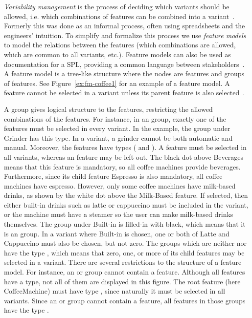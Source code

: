 \emph{Variability management} is the process of deciding which variants should be allowed, i.e. which combinations of features can be combined into a variant~\cite{art:variability-management-with-feature-models}. Formerly this was done as an informal process, often using spreadsheets and the engineers' intuition. To simplify and formalize this process we use \emph{feature models} to model the relations between the features (which combinations are allowed, which are common to all variants, etc.). Feature models can also be used as documentation for a SPL, providing a common language between stakeholders~\cite{book:introduction-to-spl}. A feature model is a tree-like structure where the nodes are features and groups of features. See Figure~\vref{ex:fm-coffee1} for an example of a feature model. A feature cannot be selected in a variant unless its parent feature is also selected~\cite{art:feature-models-grammars-and-propositional-formulas}.

A group gives logical structure to the features, restricting the allowed combinations of the features. For instance, in an \xortype{} group, exactly one of the features must be selected in every variant. In the example, the group under Grinder has this type. In a variant, a grinder cannot be both automatic and manual. Moreover, the features have types (\optional{} and \mandatory{}). A \mandatory{} feature must be selected in all variants, whereas an \optional{} feature may be left out. The black dot above Beverages means that this feature is mandatory, so all coffee machines provide beverages. Furthermore, since its child feature Espresso is also mandatory, all coffee machines have espresso. However, only some coffee machines have milk-based drinks, as shown by the white dot above the Milk-Based feature. If selected, then either built-in drinks such as latte or cappuccino must be included in the variant, or the machine must have a steamer so the user can make milk-based drinks themselves. The group under Built-in is filled-in with black, which means that it is an \ortype{} group. In a variant where Built-in is chosen, one or both of Latte and Cappuccino must also be chosen, but not zero. The groups which are neither \xortype{} nor \ortype{} have the type \andtype{}, which means that zero, one, or more of its child features may be selected in a variant. There are several restrictions to the structure of a feature model. For instance, an \xortype{} or \ortype{} group cannot contain a \mandatory{} feature. Although all features have a type, not all of them are displayed in this figure. The root feature (here CoffeeMachine) must have type \mandatory{}, since naturally it must be selected in all variants. Since an \xortype{} or \ortype{} group cannot contain a \mandatory{} feature, all features in those groups have the type \optional{}.

